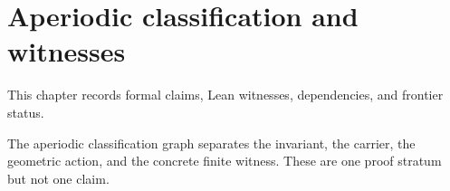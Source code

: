 \chapter{Aperiodic classification and witnesses}\label{ch:aperiodic}

This chapter records formal claims, Lean witnesses, dependencies, and frontier status.

The aperiodic classification graph separates the invariant, the carrier, the geometric action, and the concrete finite witness.  These are one proof stratum but not one claim.








